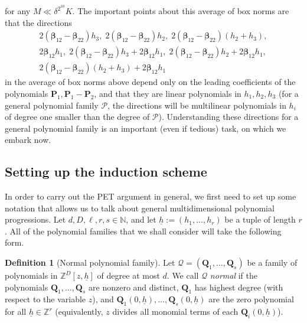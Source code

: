 \documentclass[11pt]{amsart}
\theoremstyle{definition}
\newtheorem{definition}[lemma]{Definition}
\newcommand{\N}{{\mathbb N}}
\newcommand{\Z}{{\mathbb Z}}
\newcommand{\CP}{{\mathcal P}}
\newcommand{\CQ}{{\mathcal Q}}
\newcommand{\bp}{{\mathbf{P}}}
\newcommand{\q}{{\mathbf{Q}}}
\newcommand{\bbeta}{{\boldsymbol{\beta}}}
\newcommand{\uh}{{\underline{h}}}
\begin{document}
for any $M\ll \delta^{2^{10}} K$. The important points about this average of box norms are that the directions
\begin{gather*}
     2(\bbeta_{12}-\bbeta_{22})h_3 ,\;  2(\bbeta_{12}-\bbeta_{22})h_2 ,\;  2(\bbeta_{12}-\bbeta_{22})(h_2+h_3),\\ 2\bbeta_{12}h_1,\;   2(\bbeta_{12}-\bbeta_{22})h_3 + 2\bbeta_{12}h_1,\;  2(\bbeta_{12}-\bbeta_{22})h_2 + 2\bbeta_{12}h_1,\\  2(\bbeta_{12}-\bbeta_{22})(h_2+h_3) + 2\bbeta_{12}h_1
\end{gather*}
in the average of box norms above depend only on the leading coefficients of the polynomials $\bp_1, \bp_1-\bp_2$, and that they are linear polynomials in $h_1, h_2, h_3$ (for a general polynomial family $\CP$, the directions will be multilinear polynomials in $h_i$ of degree one smaller than the degree  of $\CP$). Understanding these directions for a general polynomial family is an important (even if tedious) task, on which we embark now.


\subsection{Setting up the induction scheme}\label{SS: setting up PET}

In order to carry out the PET argument in general, we first need to set up some notation that allows us to talk about general multidimensional polynomial progressions. Let $d, D, \ell, r, s\in\N$, and let $\uh:=(h_1, \ldots, h_r)$ be a tuple of length $r$. All of the polynomial families that we shall consider will take the following form.
\begin{definition}[Normal polynomial family]
    Let $\CQ = (\q_1, \ldots, \q_{s})$ be a family of polynomials in $\Z^D[z, \uh]$ of degree at most $d$. We call $\CQ$ \textit{normal} if the polynomials $\q_1, \ldots, \q_s$ are nonzero and distinct, $\q_1$ has highest degree (with respect to the variable $z$), and $\q_1(0, \uh), \ldots, \q_s(0,\uh)$ are the zero polynomial for all $\uh\in\Z^r$ (equivalently, $z$ divides all monomial terms of each $\q_i(0,\uh)$).
\end{definition}
\end{document}
